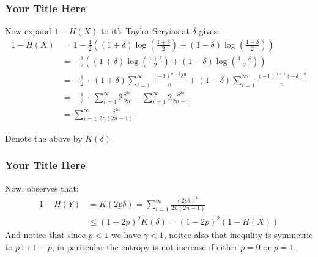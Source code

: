 \documentclass{beamer}
\begin{document}
\begin{frame}
  \frametitle{Your Title Here}
Now expand $ 1 - H(X)$ to it's Taylor Seryias at $\delta$ gives: 
\begin{equation*}
  \begin{split}
  1 - H(X) &= 1 - \frac{1}{2} \left( \left( 1 + \delta \right) \log       \left( \frac{1 + \delta}{2} \right) + \left( 1 - \delta \right) \log       \left( \frac{1 - \delta}{2} \right) \right) \\ 
  &=- \frac{1}{2} \left( \left( 1 + \delta \right) \log       \left( \frac{1 + \delta}{2} \right) + \left( 1 - \delta \right) \log       \left( \frac{1 - \delta}{2} \right) \right) \\ 
  &= - \frac{1}{2} \ \cdot \  (1+ \delta) \sum_{i=1}^{\infty}{ \frac{(-1)^{n+1}\delta^{n}}{n} } +  (1- \delta) \sum_{i=1}^{\infty}{ \frac{(-1)^{n+1}(-\delta)^{n}}{n} }\\
&=  - \frac{1}{2} \ \cdot \   \sum_{i=1}^{\infty}{2 \frac{\delta^{2n}}{2n} }  - \sum_{i=1}^{\infty}{ 2\frac{\delta^{2n}}{2n-1} }\\ 
      &= \sum_{ i =1 }^{\infty} \frac{\delta^{2n} }{ 2n(2n-1)  } 
  \end{split}
\end{equation*}

Denote the above by $K(\delta)$

\end{frame}


\begin{frame}
  \frametitle{Your Title Here}
  Now, observes that: 
  \begin{equation*}
    \begin{split}
      1 - H(Y) &= K(2p \delta) = \sum_{ i =1 }^{\infty} \frac{(2 p\delta)^{2n} }{ 2n(2n-1)  }\\
      &\le ( 1 -2p)^{2}K(\delta) = ( 1 - 2p)^{2}( 1 - H(X) )
    \end{split}
  \end{equation*}
  And notice that since $p < 1$ we have $\gamma < 1$, noitce also that inequlity is symmetric to $p \mapsto 1 - p$, in paritcular the entropy is not increase if eithrr $p =0$ or $p=1$.
\end{frame}  
\end{document}
